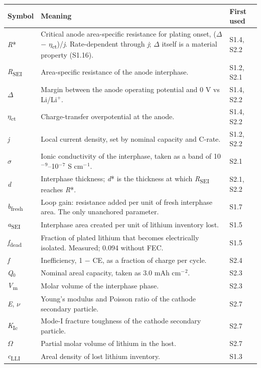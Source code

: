\documentclass[11pt,a4paper]{article}
\renewcommand{\arraystretch}{1.15}
\begin{document}
\begingroup\small
\setlength{\tabcolsep}{3pt}
\renewcommand{\arraystretch}{1.12}
\sloppy
\begin{longtable}{@{}>{\raggedright\arraybackslash}p{}>{\raggedright\arraybackslash}p{}>{\raggedright\arraybackslash}p{}@{}}
\hline
\textbf{Symbol} & \textbf{Meaning} & \textbf{First used} \\ \hline
\endhead
\emph{R}* & Critical anode area-specific resistance for plating onset, (\ensuremath{\Delta} \ensuremath{-} \ensuremath{\eta}\textsubscript{ct})/\emph{j}. Rate-dependent through \emph{j}; \ensuremath{\Delta} itself is a material property (S1.16). & S1.4, S2.2 \\
\emph{R}\textsubscript{SEI} & Area-specific resistance of the anode interphase. & S1.2, S2.1 \\
\ensuremath{\Delta} & Margin between the anode operating potential and 0 V vs Li/Li\ensuremath{^{+}}. & S1.4, S2.2 \\
\ensuremath{\eta}\textsubscript{ct} & Charge-transfer overpotential at the anode. & S1.4, S2.2 \\
\emph{j} & Local current density, set by nominal capacity and C-rate. & S1.2, S2.2 \\
\ensuremath{\sigma} & Ionic conductivity of the interphase, taken as a band of 10\ensuremath{^{-}}\ensuremath{^{9}}--10\ensuremath{^{-}}\ensuremath{^{7}} S cm\ensuremath{^{-}}\ensuremath{^{1}}. & S2.1 \\
\emph{d} & Interphase thickness; \emph{d}* is the thickness at which \emph{R}\textsubscript{SEI} reaches \emph{R}*. & S2.1, S2.2 \\
\emph{b}\textsubscript{fresh} & Loop gain: resistance added per unit of fresh interphase area. The only unanchored parameter. & S1.7 \\
\emph{a}\textsubscript{SEI} & Interphase area created per unit of lithium inventory lost. & S1.5 \\
\emph{f}\textsubscript{dead} & Fraction of plated lithium that becomes electrically isolated. Measured; 0.094 without FEC. & S1.5 \\
\emph{f} & Inefficiency, 1 \ensuremath{-} CE, as a fraction of charge per cycle. & S2.4 \\
\emph{Q}\ensuremath{_{0}} & Nominal areal capacity, taken as 3.0 mAh cm\ensuremath{^{-}}\ensuremath{^{2}}. & S2.3 \\
\emph{V}\textsubscript{m} & Molar volume of the interphase phase. & S2.3 \\
\emph{E}, \ensuremath{\nu} & Young's modulus and Poisson ratio of the cathode secondary particle. & S2.7 \\
\emph{K}\textsubscript{Ic} & Mode-I fracture toughness of the cathode secondary particle. & S2.7 \\
\ensuremath{\Omega} & Partial molar volume of lithium in the host. & S2.7 \\
\emph{c}\textsubscript{LLI} & Areal density of lost lithium inventory. & S1.3 \\
\hline
\end{longtable}
\endgroup
\end{document}
